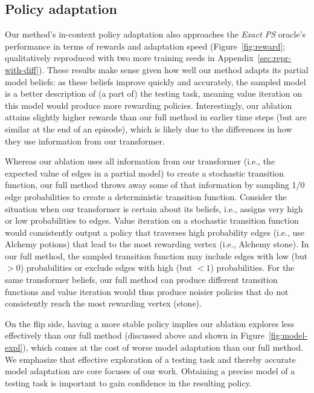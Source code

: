 \documentclass[sigconf]{aamas}
\begin{document}
\subsection{Policy adaptation}
Our method's in-context policy adaptation also approaches the \textit{Exact PS} oracle's performance in terms of rewards and adaptation speed (Figure~\ref{fig:reward}; qualitatively reproduced with two more training seeds in Appendix~\ref{sec:repr-with-diff}). These results make sense given how well our method adapts its partial model beliefs: as these beliefs improve quickly and accurately, the sampled model is a better description of (a part of) the testing task, meaning value iteration on this model would produce more rewarding policies. Interestingly, our ablation attains slightly higher rewards than our full method in earlier time steps (but are similar at the end of an episode), which is likely due to the differences in how they use information from our transformer.

Whereas our ablation uses all information from our transformer (i.e., the expected value of edges in a partial model) to create a stochastic transition function, our full method throws away some of that information by sampling 1/0 edge probabilities to create a deterministic transition function. Consider the situation when our transformer is certain about its beliefs, i.e., assigns very high or low probabilities to edges. Value iteration on a stochastic transition function would consistently output a policy that traverses high probability edges (i.e., use Alchemy potions) that lead to the most rewarding vertex (i.e., Alchemy stone). In our full method, the sampled transition function may include edges with low (but $>0$) probabilities or exclude edges with high (but $<1$) probabilities. For the same transformer beliefs, our full method can produce different transition functions and value iteration would thus produce noisier policies that do not consistently reach the most rewarding vertex (stone).

On the flip side, having a more stable policy implies our ablation explores less effectively than our full method (discussed above and shown in Figure~\ref{fig:model-expl}), which comes at the cost of worse model adaptation than our full method. We emphasize that effective exploration of a testing task and thereby accurate model adaptation are core focuses of our work. Obtaining a precise model of a testing task is important to gain confidence in the resulting policy.
\end{document}
